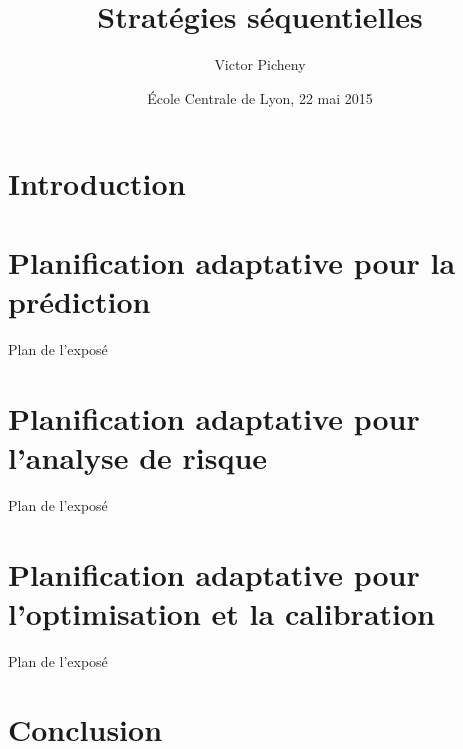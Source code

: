 \documentclass[10pt]{beamer}
\title{Stratégies séquentielles}
\author{Victor Picheny}
\date{\'Ecole Centrale de Lyon, 22 mai 2015}
\institute{\texttt{[image: logo.png]}}
\begin{document}
\begin{frame}
    	\maketitle
\end{frame}

\section{Introduction}

\section[Prédiction]{Planification adaptative pour la prédiction}
\begin{frame}{Plan de l'exposé}
\tableofcontents
\end{frame}

\section[Analyse de risque]{Planification adaptative pour l'analyse de risque}
\begin{frame}{Plan de l'exposé}
\tableofcontents
\end{frame}

\section[Optimisation]{Planification adaptative pour l'optimisation et la calibration}
\begin{frame}{Plan de l'exposé}
\tableofcontents
\end{frame}


\section[Conclusion]{Conclusion}

% 
\end{document}
